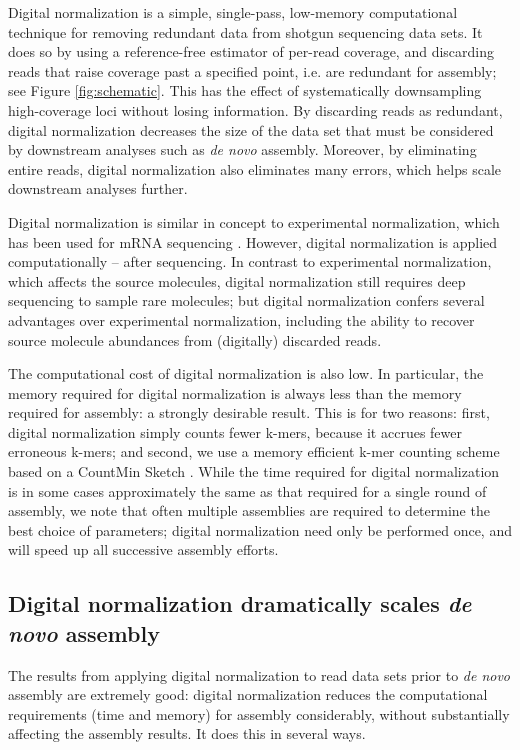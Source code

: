 \documentclass{pnastwo}
\begin{document}
\begin{article}
Digital normalization is a simple, single-pass, low-memory
computational technique for removing redundant data from shotgun
sequencing data sets.  It does so by using a reference-free estimator
of per-read coverage, and discarding reads that raise coverage past a
specified point, i.e. are redundant for assembly; see Figure
\ref{fig:schematic}.  This has the effect of systematically
downsampling high-coverage loci without losing information.  By
discarding reads as redundant, digital normalization decreases the
size of the data set that must be considered by downstream analyses
such as {\em de novo} assembly.  Moreover, by eliminating entire
reads, digital normalization also eliminates many errors, which helps
scale downstream analyses further.

Digital normalization is similar in concept to experimental
normalization, which has been used for mRNA sequencing
\cite{pubmed8889548,pubmed7937745}. However, digital normalization is
applied computationally -- after sequencing.  In contrast to
experimental normalization, which affects the source molecules, digital
normalization still requires deep sequencing to sample rare molecules;
but digital normalization confers several advantages over experimental
normalization, including the ability to recover source molecule
abundances from (digitally) discarded reads.

The computational cost of digital normalization is also low.  In
particular, the memory required for digital normalization is always
less than the memory required for assembly: a strongly desirable
result.  This is for two reasons: first, digital normalization simply
counts fewer k-mers, because it accrues fewer erroneous k-mers; and
second, we use a memory efficient k-mer counting scheme based on a
CountMin Sketch \cite{countminsketch}.  While the time required for
digital normalization is in some cases approximately the same as that
required for a single round of assembly, we note that often multiple
assemblies are required to determine the best choice of parameters;
digital normalization need only be performed once, and will speed up
all successive assembly efforts.

\subsection{Digital normalization dramatically scales {\em de novo} assembly}

The results from applying digital normalization to read data sets
prior to {\em de novo} assembly are extremely good: digital normalization
reduces the computational requirements (time and memory) for assembly
considerably, without substantially affecting the assembly results.
It does this in several ways.


\end{article}
\end{document}
